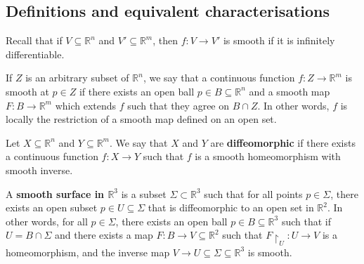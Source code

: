 \documentclass[a4paper,11pt]{article}
\begin{document}
\subsection{Definitions and equivalent characterisations}
Recall that if \( V \subseteq \mathbb R^n \) and \( V' \subseteq \mathbb R^m \), then \( f \colon V \to V' \) is smooth if it is infinitely differentiable.
\begin{definition}
	If \( Z \) is an arbitrary subset of \( \mathbb R^n \), we say that a continuous function \( f \colon Z \to \mathbb R^m \) is smooth at \( p \in Z \) if there exists an open ball \( p \in B \subseteq \mathbb R^n \) and a smooth map \( F \colon B \to \mathbb R^m \) which extends \( f \) such that they agree on \( B \cap Z \).
	In other words, \( f \) is locally the restriction of a smooth map defined on an open set.
\end{definition}
\begin{definition}
	Let \( X \subseteq \mathbb R^n \) and \( Y \subseteq \mathbb R^m \).
	We say that \( X \) and \( Y \) are \textbf{diffeomorphic} if there exists a continuous function \( f \colon X \to Y \) such that \( f \) is a smooth homeomorphism with smooth inverse.
\end{definition}

\begin{definition}
	A \textbf{smooth surface in \( \mathbb R^3 \)} is a subset \(\Sigma \subset \mathbb R^3 \) such that for all points \( p \in \Sigma \), there exists an open subset \( p \in U \subseteq \Sigma \) that is diffeomorphic to an open set in \( \mathbb R^2 \).
	In other words, for all \( p \in \Sigma \), there exists an open ball \( p \in B \subseteq \mathbb R^3 \) such that if \( U = B \cap \Sigma \) and there exists a map \( F \colon B \to V \subseteq \mathbb R^2 \) such that \( {F}\restriction_U \colon U \to V \) is a homeomorphism, and the inverse map \( V \to U \subseteq \Sigma \subseteq \mathbb R^3 \) is smooth.
\end{definition}
\end{document}
